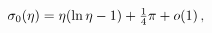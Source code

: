 $\mathop{{\sigma_{0}}\/}\nolimits\!\left(\eta\right)=\eta(\mathop{\ln\/}%
\nolimits\eta-1)+\tfrac{1}{4}\pi+\mathop{o\/}\nolimits\!\left(1\right),$